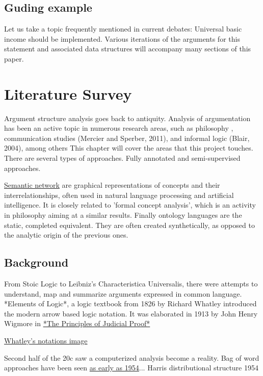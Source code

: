 \documentclass{report}
\begin{document}
\section{Guding example}

Let us take a topic frequently mentioned in current debates: Universal basic income should be implemented.
Various iterations of the arguments for this statement and associated data structures will accompany many sections of this paper.

\newpage

\chapter{Literature Survey}
Argument structure analysis goes back to antiquity. \cite{angelelli_techniques_1970}
Analysis of argumentation has been an active topic in numerous research areas, such as philosophy \cite{van_eemeren_systematic_2003}, communication studies (Mercier and Sperber, 2011), and informal logic (Blair, 2004), among others This chapter will cover the areas that this project touches. There are several types of approaches. Fully annotated and semi-supervised approaches.

\href{https://en.wikipedia.org/wiki/Semantic_network}{Semantic network} are graphical representations of concepts and their interrelationships, often used in natural language processing and artificial intelligence. It is closely related to 'formal concept analysis', which is an activity in philosophy aiming at a similar results. Finally ontology languages are the static, completed equivalent. They are often created synthetically, as opposed to the analytic origin of the previous ones.

\section{Background}
From Stoic Logic to Leibniz's Characteristica Universalis, there were attempts to understand, map and summarize arguments expressed in common language. 
*Elements of Logic*, a logic textbook from 1826 by Richard Whatley introduced the modern arrow based logic notation. It was elaborated in 1913 by John Henry Wigmore in \href{https://archive.org/details/principlesjudic00wigmgoog}{*The Principles of Judicial Proof*}

\href{https://commons.wikimedia.org/wiki/File:Whatley.png}{Whatley's notations image}

Second half of the 20c saw a computerized analysis become a reality. Bag of word approaches have been seen \href{https://www.tandfonline.com/doi/abs/10.1080/00437956.1954.11659520}{as early as 1954}...
Harris distributional structure 1954
\end{document}
